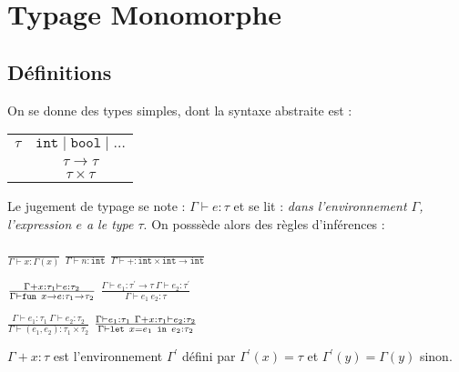\documentclass{cours}
\begin{document}
\section{Typage Monomorphe}
\subsection{Définitions}
On se donne des types simples, dont la syntaxe abstraite est : 
\begin{tabular}{c@{$\mid$}c}
    $\tau$ & $\texttt{int} \mid \texttt{bool} \mid \ldots$\\
    & $\tau \rightarrow \tau$\\
    &$\tau \times \tau$    
\end{tabular}

Le jugement de typage se note : $\Gamma \vdash e :\tau$ et se lit : \textsl{dans l'environnement $\Gamma$, l'expression $e$ a le type $\tau$}.
On posssède alors des règles d'inférences : 
\begin{center}
    $\frac{}{\Gamma \vdash x : \Gamma(x)}$ 
    $\frac{}{\Gamma \vdash n : \texttt{int}}$
    $\frac{}{\Gamma \vdash + : \texttt{int} \times \texttt{int} \rightarrow \texttt{int}}$
\end{center}
\begin{center}
    $\frac{\Gamma + x : \tau_{1} \vdash e : \tau_{2}}{\Gamma \vdash \texttt{fun } x \rightarrow e:\tau_{1}\rightarrow\tau_{2}}$
    $\frac{\Gamma \vdash e_{1} : \tau^{'}\rightarrow\tau \ \Gamma \vdash e_{2} : \tau^{'}}{\Gamma \vdash e_{1}\ e_{2} : \tau}$
\end{center}
\begin{center}
    $\frac{\Gamma \vdash e_{1} : \tau_{1} \ \Gamma \vdash e_{2} : \tau_{2}}{\Gamma \vdash (e_{1},e_{2}) : \tau_{1} \times \tau_{2}}$
    $\frac{\Gamma \vdash e_{1} : \tau_{1} \ \Gamma + x : \tau_{1} \vdash e_{2} : \tau_{2}}{\Gamma \vdash \texttt{let } x = e_{1} \texttt{ in } e_{2} : \tau_{2}}$
\end{center}
$\Gamma + x : \tau$ est l'environnement $\Gamma^{'}$ défini par $\Gamma^{'}(x) = \tau$ et $\Gamma^{'}(y) = \Gamma(y)$ sinon.
\end{document}
